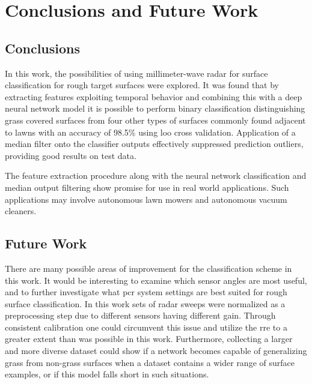 \chapter{Conclusions and Future Work}

\section{Conclusions}

In this work, the possibilities of using millimeter-wave radar for surface classification for rough target surfaces were explored. It was found that by extracting features exploiting temporal behavior and combining this with a deep neural network model it is possible to perform binary classification distinguishing grass covered surfaces from four other types of surfaces commonly found adjacent to lawns with an accuracy of 98.5\% using \gls{loo} cross validation. Application of a median filter onto the classifier outputs effectively suppressed prediction outliers, providing good results on test data. 

The feature extraction procedure along with the neural network classification and median output filtering show promise for use in real world applications. Such applications may involve autonomous lawn mowers and autonomous vacuum cleaners. 



\section{Future Work}

There are many possible areas of improvement for the classification scheme in this work. It would be interesting to examine which sensor angles are most useful, and to further investigate what \gls{pcr} system settings are best suited for rough surface classification. In this work sets of radar sweeps were normalized as a preprocessing step due to different sensors having different gain. Through consistent calibration one could circumvent this issue and utilize the \gls{rre} to a greater extent than was possible in this work. Furthermore, collecting a larger and more diverse dataset could show if a network becomes capable of generalizing grass from non-grass surfaces when a dataset contains a wider range of surface examples, or if this model falls short in such situations. 

